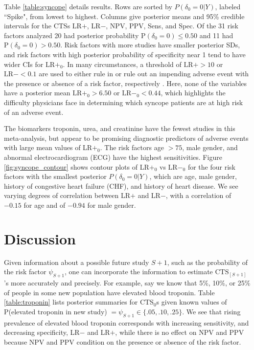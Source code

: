 \documentclass[AMA,STIX1COL]{WileyNJD-v2}
\newcommand{\CTSo}{\text{CTS}_0}
\begin{document}
Table \ref{table:syncope} details results. Rows are sorted by $P(\delta_0 = 0 \vert Y)$, labeled ``Spike", from lowest to highest. Columns give posterior means and 95\% credible intervals for the CTSs LR$+$, LR$-$, NPV, PPV, Sens, and Spec. Of the 31 risk factors analyzed 20 had posterior probability $\mbox{P}(\delta_0 = 0) \le 0.50$ and 11 had $\mbox{P}(\delta_0 = 0) > 0.50$. Risk factors with more studies have smaller posterior SDs, and risk factors with high posterior probability of specificity near 1 tend to have wider CIs for LR$+_0$. In many circumstances, a threshold of $\mbox{LR}+ > 10$ or $\text{LR}- < 0.1$ are used to either rule in or rule out an impending adverse event with the presence or absence of a risk factor, respectively \cite{deeks2004diagnostic, ranganathan2018understanding}. Here, none of the variables have a posterior mean $\mbox{LR}+_0 > 6.50$ or $\text{LR}-_0 < 0.44$, which highlights the difficulty physicians face in determining which syncope patients are at high risk of an adverse event. 

The biomarkers troponin, urea, and creatinine have the fewest studies in this meta-analysis, but appear to be promising diagnostic predictors of adverse events with large mean values of LR$+_0$. The risk factors age $> 75$, male gender, and abnormal electrocardiogram (ECG) have the highest sensitivities. Figure \ref{fig:syncope_contour} shows contour plots of LR$+_0$ vs LR$-_0$ for the four risk factors with the smallest posterior $P(\delta_0 = 0 \vert Y)$, which are age, male gender, history of congestive heart failure (CHF), and history of heart disease. We see varying degrees of correlation between LR$+$ and LR$-$, with a correlation of $-0.15$ for age and of $-0.94$ for male gender. 

\section{Discussion} \label{sec:discussion}

Given information about a possible future study $S + 1$, such as the probability of the risk factor $\psi_{S+1}$, one can incorporate the information to estimate $\text{CTS}_{[S + 1]}$'s more accurately and precisely. For example, say we know that 5\%, 10\%, or 25\% of people in some new population have elevated blood troponin. Table \ref{table:troponin} lists posterior summaries for $\CTSo$s given known values of P(elevated troponin in new study) $= \psi_{S+1} \in \{.05, .10, .25\}$. We see that rising prevalence of elevated blood troponin corresponds with increasing sensitivity, and decreasing specificity, LR$-$ and LR$+$, while there is no effect on NPV and PPV because NPV and PPV condition on the presence or absence of the risk factor. 
\end{document}
